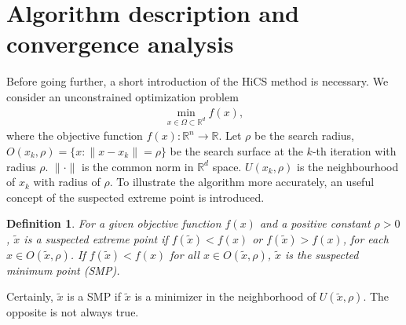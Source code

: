 \documentclass[final,1p,times]{elsarticle}
\newtheorem{definition}{Definition}
\def\bbR{\mathbb{R}}
\begin{document}
\section{Algorithm description and convergence analysis}
\label{sec:algorithm}

Before going further, a short introduction of the
HiCS method is necessary.
We consider an unconstrained optimization problem 
\begin{align}
	\min_{x\in\Omega\subset\mathbb{R}^d} f(x),
	\label{}
\end{align}
where the objective function $f(x):\bbR^n\rightarrow \bbR$.
Let $\rho$ be the search radius, $O(x_k, \rho)=\{x:
\|x-x_k \|=\rho\}$ be the search surface at the
$k$-th iteration with radius $\rho$. $\|\cdot \|$ is the common
norm in $\bbR^d$ space.  $U(x_k, \rho)$ is the neighbourhood of
$x_k$ with radius of $\rho$.  To illustrate the algorithm
more accurately, an useful concept of the suspected extreme point is
introduced.
\begin{definition}	
	For a given objective function $f(x)$ and a positive constant 
	$\rho>0$, $\tilde{x}$ is a suspected extreme point if
	$f(\tilde x)<f(x)$ or $f(\tilde x)>f(x)$, for each $x \in O(\tilde{x},\rho)$.
	If $f(\tilde x) < f(x)$ for all $x\in O(\tilde{x},\rho)$,
	$\tilde{x}$ is the suspected minimum point (SMP).
\end{definition}
Certainly, $\tilde{x}$ is a SMP if $\tilde{x}$ is a minimizer in
the neighborhood of $U(\tilde{x}, \rho)$. The opposite is not always true.
\end{document}
